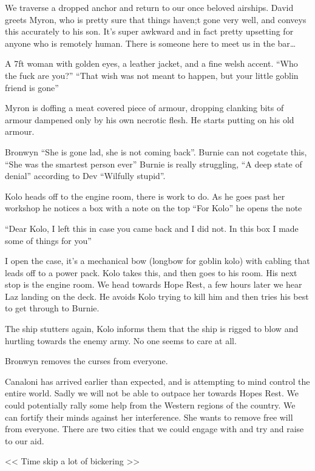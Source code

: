 We traverse a dropped anchor and return to our once beloved airships. David greets Myron, who is pretty sure that things haven;t gone very well, and conveys this accurately to his son. It's super awkward and in fact pretty upsetting for anyone who is remotely human. There is someone here to meet us in the bar…\medskip

A 7ft woman with golden eyes, a leather jacket, and a fine welsh accent. “Who the fuck are you?” “That wish was not meant to happen, but your little goblin friend is gone”\medskip

Myron is doffing a meat covered piece of armour, dropping clanking bits of armour dampened only by his own necrotic flesh. He starts putting on his old armour.\medskip

Bronwyn “She is gone lad, she is not coming back”. Burnie can not cogetate this, “She was the smartest person ever” Burnie is really struggling, “A deep state of denial” according to Dev “Wilfully stupid”.\medskip

Kolo heads off to the engine room, there is work to do. As he goes past her workshop he notices a box with a note on the top “For Kolo” he opens the note\medskip

“Dear Kolo, I left this in case you came back and I did not. In this box I made some of things for you”\medskip

I open the case, it's a mechanical bow (longbow for goblin kolo) with cabling that leads off to a power pack. Kolo takes this, and then goes to his room. His next stop is the engine room. We head towards Hope Rest, a few hours later we hear Laz landing on the deck. He avoids Kolo trying to kill him and then tries his best to get through to Burnie.\medskip

The ship stutters again, Kolo informs them that the ship is rigged to blow and hurtling towards the enemy army. No one seems to care at all.\medskip

Bronwyn removes the curses from everyone.\medskip

Canaloni has arrived earlier than expected, and is attempting to mind control the entire world. Sadly we will not be able to outpace her towards Hopes Rest. We could potentially rally some help from the Western regions of the country. We can fortify their minds against her interference. She wants to remove free will from everyone. There are two cities that we could engage with and try and raise to our aid.\medskip

<< Time skip a lot of bickering >>\medskip

